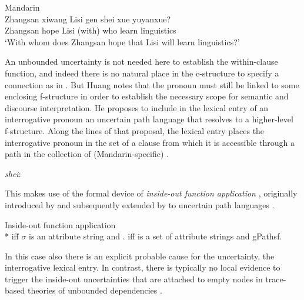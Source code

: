 \documentclass[output=paper,hidelinks]{langscibook}
\begin{document}
 \ea\label{mandarinquestion}Mandarin\\
\gll Zhangsan xiwang Lisi gen shei xue yuyanxue?\\
      Zhangsan hope Lisi (with) who learn linguistics\\
 \glt    `With whom does Zhangsan hope that Lisi will learn linguistics?'
 \z
 
\noindent An unbounded uncertainty is not needed here to establish the within-clause function, and indeed there is no natural place in the c-structure to specify a \mbox{} connection as in .  But Huang notes that the pronoun must still be linked to some enclosing f-structure in order to establish the necessary scope for semantic and discourse interpretation.  He proposes to include in the lexical entry of an interrogative pronoun an uncertain path language that resolves to a higher-level f-structure.  Along the lines of that proposal, the lexical entry  places the interrogative pronoun in the \FOCUS set of a clause from which it is accessible through a path in the collection of (Mandarin-specific) .

\ea\label{shei}
    \textit{shei}: \ \    
\z

\noindent This makes use of the formal device of \textit{inside-out function application} , originally introduced by \citet{kaplan1988} and subsequently extended by \citet{HalvorsenKaplan1988} to uncertain path languages . 

\ea\label{insideout} Inside-out function application\\*
\ea\label{insideouta}  iff  $\sigma$ is an attribute string and .
\ex\label{insideoutb}  iff  is a set of attribute strings and \nvaln g{Paths}f. %
\z\z

\noindent In this case also there is an explicit probable cause for the uncertainty, the interrogative lexical entry.  In contrast, there is typically no local evidence to trigger the inside-out uncertainties that are attached to empty nodes in trace-based theories of unbounded dependencies \citep[e.g.][]{bresnan2001lexical,BresnanEtAl2016}.

\end{document}
